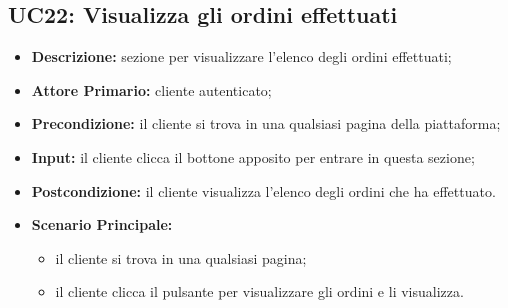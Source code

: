 \subsection{UC22: Visualizza gli ordini effettuati}
\label{sec:UC22}
\begin{itemize}
    \item \textbf{Descrizione:} sezione per visualizzare l'elenco degli ordini effettuati;
    \item \textbf{Attore Primario:} cliente autenticato;
    \item \textbf{Precondizione:} il cliente si trova in una qualsiasi pagina della piattaforma;
    \item \textbf{Input:} il cliente clicca il bottone apposito per entrare in questa sezione;
    \item \textbf{Postcondizione:} il cliente visualizza l'elenco degli ordini che ha effettuato.
    \item \textbf{Scenario Principale:}
          \begin{itemize}
              \item il cliente si trova in una qualsiasi pagina;
              \item il cliente clicca il pulsante per visualizzare gli ordini e li visualizza.
          \end{itemize}
\end{itemize}